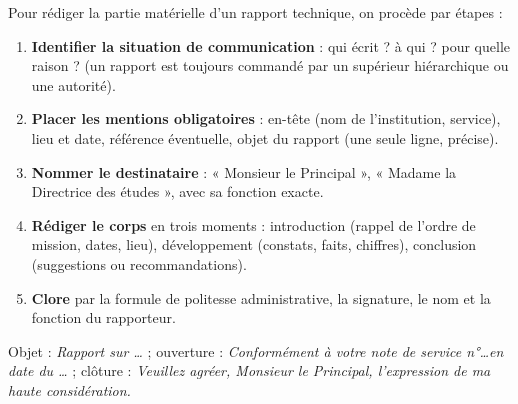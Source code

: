 \documentclass[11pt]{article}
\begin{document}
\begin{methode}
Pour rédiger la partie matérielle d'un rapport technique, on procède par étapes :
\begin{enumerate}
\item \textbf{Identifier la situation de communication} : qui écrit ? à qui ? pour quelle raison ? (un rapport est toujours commandé par un supérieur hiérarchique ou une autorité).
\item \textbf{Placer les mentions obligatoires} : en-tête (nom de l'institution, service), lieu et date, référence éventuelle, objet du rapport (une seule ligne, précise).
\item \textbf{Nommer le destinataire} : « Monsieur le Principal », « Madame la Directrice des études », avec sa fonction exacte.
\item \textbf{Rédiger le corps} en trois moments : introduction (rappel de l'ordre de mission, dates, lieu), développement (constats, faits, chiffres), conclusion (suggestions ou recommandations).
\item \textbf{Clore} par la formule de politesse administrative, la signature, le nom et la fonction du rapporteur.
\end{enumerate}
\begin{aretenir}
Objet : \emph{Rapport sur \ldots} ; ouverture : \emph{Conformément à votre note de service n°\ldots en date du \ldots} ; clôture : \emph{Veuillez agréer, Monsieur le Principal, l'expression de ma haute considération.}
\end{aretenir}
\end{methode}
\end{document}
